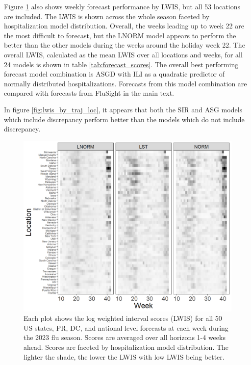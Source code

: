 \documentclass[ba]{imsart}
\theoremstyle{plain}
\theoremstyle{definition}
\theoremstyle{remark}
\begin{document}
\begin{supplement}
Figure \ref{fig:lwis_by_dist_loc} also shows weekly forecast performance by 
LWIS, but all 53 locations are included. The LWIS is shown across the whole 
season faceted by hospitalization model distribution. Overall, the weeks 
leading up to week 22 are the most difficult to forecast, but the LNORM model 
appears to perform the better than the other models during the weeks around 
the holiday week 22. 
The overall LWIS, calculated as the mean LWIS over all locations and weeks, 
for all 
24 models is shown in table \ref{tab:forecast_scores}. The overall best 
performing forecast model combination is ASGD with ILI as a quadratic 
predictor of normally distributed hospitalizations. Forecasts from this 
model combination are compared with forecasts from FluSight in the main text.

In figure \ref{fig:lwis_by_traj_loc}, it appears that both the SIR and ASG 
models which include discrepancy perform better than the models 
which do not include discrepancy.

\begin{figure}[hbt!]
    
    \centering
    \includegraphics[scale = .6]{Images/lwis_by_dist_loc.png}
    \caption{Each plot shows the log weighted interval scores (LWIS) for all 50 
    US states, PR, DC, and national level forecasts at each week during the 
    2023 flu season. Scores are averaged over all horizons 1-4 weeks ahead. 
    Scores are faceted by hospitalization model distribution. The lighter the 
    shade, the lower the LWIS with low LWIS being better.}
    \label{fig:lwis_by_dist_loc}
\end{figure}





\end{supplement}
\end{document}
